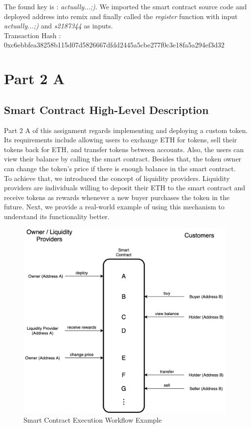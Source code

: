 \documentclass[12pt,a4paper]{article}
\begin{document}
\vspace{5mm}

The found key is : \emph{actually...;)}. We imported the smart contract source
code and deployed address into remix and finally called the \emph{register}
function with input \emph{actually...;)} and \emph{s2187344} as inputs. \\

Transaction Hash : 0xc6ebbfea38258b115d07d5826667dfdd2445a5cbe277f0c3e18fa5a294ef3d32

\section*{Part 2 A}

\subsection*{Smart Contract High-Level Description}

Part 2 A of this assignment regards implementing and deploying a custom token.
Its requirements include allowing users to exchange ETH for tokens, sell their
tokens back for ETH, and transfer tokens between accounts. Also, the users can
view their balance by calling the smart contract. Besides that, the token owner
can change the token's price if there is enough balance in the smart contract. \\

To achieve that, we introduced the concept of liquidity providers. Liquidity
providers are individuals willing to deposit their ETH to the smart contract and
receive tokens as rewards whenever a new buyer purchases the token in the
future. Next, we provide a real-world example of using this mechanism to
understand its functionality better. \\


\begin{figure}[htpb]
    \begin{center}
        \includegraphics[height=10cm]{execution_flow.png}
        \caption{Smart Contract Execution Workflow Example}
        \label{fig:smart-contract-example}
    \end{center}
\end{figure} 
\end{document}
